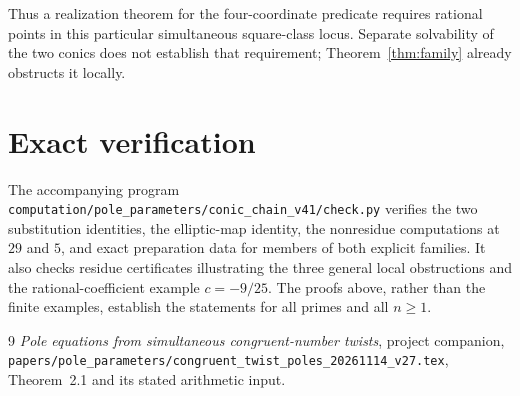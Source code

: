 \documentclass[10pt,a4paper]{article}
\begin{document}
Thus a realization theorem for the four-coordinate predicate requires
rational points in this particular simultaneous square-class locus.
Separate solvability of the two conics does not establish that
requirement; Theorem~\ref{thm:family} already obstructs it locally.

\section{Exact verification}
The accompanying program
\nolinkurl{computation/pole_parameters/conic_chain_v41/check.py}
verifies the two substitution identities, the elliptic-map identity,
the nonresidue computations at $29$ and $5$, and exact preparation
data for members of both explicit families. It also checks residue
certificates illustrating the three general local obstructions and
the rational-coefficient example $c=-9/25$. The proofs above, rather than the
finite examples, establish the statements for all primes and all
$n\ge1$.

\begin{thebibliography}{9}
 \emph{Pole equations from simultaneous congruent-number
twists}, project companion,
\nolinkurl{papers/pole_parameters/congruent_twist_poles_20261114_v27.tex},
Theorem~2.1 and its stated arithmetic input.
\end{thebibliography}
\end{document}
